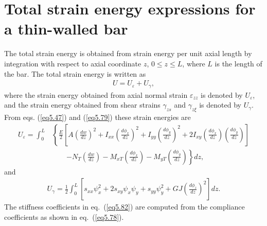 \documentclass{AeroStructure-ERJohnson}
\begin{document}
\section{Total strain energy expressions for a thin-walled bar}\label{sec5.6}

The total strain energy is obtained from strain energy per unit axial length by integration with respect to axial coordinate $z$, $0 \leq z \leq L$, where $L$ is the length of the bar. The total strain energy is written as
\begin{align}\label{eq5.80}
U=U_{\varepsilon}+U_{\gamma},
\end{align}
where the strain energy obtained from axial normal strain $\varepsilon_{z z}$ is denoted by $U_{\varepsilon}$, and the strain energy obtained from shear strains $\gamma_{z s}$ and $\gamma_{z \xi}$ is denoted by $U_{\gamma}$. From eqs. (\ref{eq5.47}) and (\ref{eq5.79}) these strain energies are\pagebreak
\begin{align}\label{eq5.81}
U_{\varepsilon}=\int_{0}^{L}&\left\{\frac{E}{2}\left[A\left(\frac{d w}{d z}\right)^{2}+I_{x x}\left(\frac{d \phi_{x}}{d z}\right)^{2}+I_{y y}\left(\frac{d \phi_{y}}{d z}\right)^{2}+2 I_{x y}\left(\frac{d \phi_{x}}{d z}\right)\left(\frac{d \phi_{y}}{d z}\right)\right]\right.\nonumber\\
&\qquad\left.-N_{T}\left(\frac{d w}{d z}\right)-M_{x T}\left(\frac{d \phi_{x}}{d z}\right)-M_{y T}\left(\frac{d \phi_{y}}{d z}\right)\right\} d z,
\end{align}
and
\begin{align}\label{eq5.82}
U_{\gamma}=\frac{1}{2} \int^L_0\left[s_{x x} \psi_{x}^{2}+2 s_{x y} \psi_{x} \psi_{y}+s_{y y} \psi_{y}^{2}+G J\left(\frac{d \phi_{z}}{d z}\right)^{2}\right] d z.
\end{align}
The stiffness coefficients in eq.~(\ref{eq5.82}) are computed from the compliance coefficients as shown in eq.~(\ref{eq5.78}).
\end{document}

